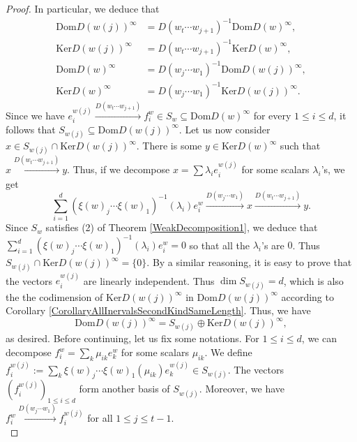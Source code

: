 \documentclass[12pt]{amsart}
\theoremstyle{definition}
\newcommand{\<}{\langle}   %
\renewcommand{\>}{\rangle} %
\begin{document}
\begin{proof}
    In particular, we deduce that 
    \begin{align}
        \label{Useful4Identities1} \mathrm{Dom}D(w(j))^{\infty} & = D(w_t\cdots w_{j+1})^{-1}\mathrm{Dom}D(w)^{\infty}, \\ 
        \label{Useful4Identities2} \mathrm{Ker}D(w(j))^{\infty} & = D(w_t\cdots w_{j+1})^{-1}\mathrm{Ker}D(w)^{\infty},\\
        \label{Useful4Identities3} \mathrm{Dom}D(w)^{\infty} & = D(w_j\cdots w_1)^{-1}\mathrm{Dom}D(w(j))^{\infty}, \\ 
        \label{Useful4Identities4} \mathrm{Ker}D(w)^{\infty} & = D(w_j\cdots w_1)^{-1}\mathrm{Ker}D(w(j))^{\infty}.
    \end{align}
    Since we have $e_i^{w(j)} \xrightarrow{D(w_t\cdots w_{j+1})} f_i^w \in S_w \subseteq  \mathrm{Dom}D(w)^{\infty}$ for every $1\leq i \leq d$, it follows that $S_{w(j)} \subseteq  \mathrm{Dom}D(w(j))^{\infty}$. Let us now consider $x \in S_{w(j)} \cap \mathrm{Ker}D(w(j))^{\infty}$. There is some $y \in \mathrm{Ker}D(w)^{\infty}$ such that $x \xrightarrow{D(w_t\cdots w_{j+1})} y$. Thus, if we decompose $x = \sum \lambda_ie_i^{w(j)}$ for some scalars $\lambda_i$'s, we get 
    \begin{equation*}
        \sum_{i=1}^d (\xi(w)_j\cdots \xi(w)_1)^{-1}(\lambda_i)e_i^w \xrightarrow{D(w_j\cdots w_1)} x \xrightarrow{D(w_t\cdots w_{j+1})} y.
    \end{equation*}
    Since $S_w$ satisfies (2) of Theorem \ref{WeakDecomposition1}, we deduce that $\sum_{i=1}^d (\xi(w)_j\cdots \xi(w)_1)^{-1}(\lambda_i)e_i^w = 0$ so that all the $\lambda_i$'s are $0$. Thus $S_{w(j)} \cap \mathrm{Ker}D(w(j))^{\infty} = \{0\}$. By a similar reasoning, it is easy to prove that the vectors $e_{i}^{w(j)}$ are linearly independent. Thus $\dim S_{w(j)} = d$, which is also the the codimension of $\mathrm{Ker}D(w(j))^{\infty}$ in $\mathrm{Dom}D(w(j))^{\infty}$ according to Corollary \ref{CorollaryAllInervalsSecondKindSameLength}. Thus, we have 
    \begin{equation*}
        \mathrm{Dom}D(w(j))^{\infty} = S_{w(j)} \oplus \mathrm{Ker}D(w(j))^{\infty},
    \end{equation*}
    as desired. Before continuing, let us fix some notations. For $1 \leq i \leq d$, we can decompose $f_i^w = \sum_k \mu_{ik}e_k^w$ for some scalars $\mu_{ik}$. We define $f_i^{w(j)} := \sum_k \xi(w)_j\cdots \xi(w)_1(\mu_{ik})e_k^{w(j)} \in S_{w(j)}$. The vectors $(f_i^{w(j)})_{1\leq i\leq d}$ form another basis of $S_{w(j)}$. Moreover, we have $f_i^{w} \xrightarrow{D(w_j\cdots w_1)} f_i^{w(j)}$ for all $1 \leq j \leq t-1$.\\

\end{proof}
\end{document}
